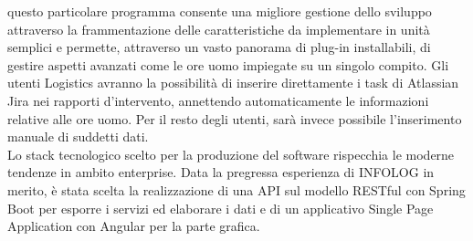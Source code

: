 questo particolare programma consente una migliore gestione dello sviluppo attraverso la frammentazione delle caratteristiche da implementare in unità semplici e permette, attraverso
un vasto panorama di plug-in installabili, di gestire aspetti avanzati come le ore uomo impiegate su un singolo compito.
Gli utenti Logistics avranno la possibilità di inserire direttamente i task di Atlassian Jira nei rapporti d'intervento, annettendo automaticamente le informazioni relative alle ore uomo.
Per il resto degli utenti, sarà invece possibile l'inserimento manuale di suddetti dati.
\\
Lo stack tecnologico scelto per la produzione del software rispecchia le moderne tendenze in ambito enterprise.
Data la pregressa esperienza di INFOLOG in merito, è stata scelta la realizzazione di una API sul modello RESTful con Spring Boot per esporre i servizi ed elaborare i dati
e di un applicativo Single Page Application con Angular per la parte grafica.